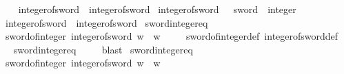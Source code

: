 \begin{isabellebody}
\ \ \isanewline
\ \ {\isachardoublequoteopen}integer{\isacharunderscore}{\kern0pt}of{\isacharunderscore}{\kern0pt}sword{}{}\ {\isasymequiv}\ integer{\isacharunderscore}{\kern0pt}of{\isacharunderscore}{\kern0pt}sword{\isachardoublequoteclose}\isanewline
\isanewline
{}\isamarkupfalse%
\ integer{\isacharunderscore}{\kern0pt}of{\isacharunderscore}{\kern0pt}sword{}{}\ {\isacharcolon}{\kern0pt}{\isacharcolon}{\kern0pt}\ {\isachardoublequoteopen}{}{}\ sword\ {\isasymRightarrow}\ integer{\isachardoublequoteclose}\isanewline
\ \ \isanewline
\ \ {\isachardoublequoteopen}integer{\isacharunderscore}{\kern0pt}of{\isacharunderscore}{\kern0pt}sword{}{}\ {\isasymequiv}\ integer{\isacharunderscore}{\kern0pt}of{\isacharunderscore}{\kern0pt}sword{\isachardoublequoteclose}\isanewline
\isanewline
{}\isamarkupfalse%
\ sword{}{\isacharunderscore}{\kern0pt}integer{\isacharunderscore}{\kern0pt}eq{\isacharcolon}{\kern0pt}\isanewline
\ \ {\isachardoublequoteopen}sword{}{\isacharunderscore}{\kern0pt}of{\isacharunderscore}{\kern0pt}integer\ {\isacharparenleft}{\kern0pt}integer{\isacharunderscore}{\kern0pt}of{\isacharunderscore}{\kern0pt}sword{}\ w{\isacharparenright}{\kern0pt}\ {\isacharequal}{\kern0pt}\ w{\isachardoublequoteclose}\ \isanewline
%
\isadelimproof
\ \ %
\endisadelimproof
%
\isatagproof
{}\isamarkupfalse%
\ sword{}{\isacharunderscore}{\kern0pt}of{\isacharunderscore}{\kern0pt}integer{\isacharunderscore}{\kern0pt}def\ integer{\isacharunderscore}{\kern0pt}of{\isacharunderscore}{\kern0pt}sword{}{\isacharunderscore}{\kern0pt}def\isanewline
\ \ \isamarkupfalse%
\ sword{\isacharunderscore}{\kern0pt}integer{\isacharunderscore}{\kern0pt}eq\ \isanewline
\ \ \isamarkupfalse%
\ blast%
\endisatagproof
{\isafoldproof}%
%
\isadelimproof
\isanewline
%
\endisadelimproof
\isanewline
{}\isamarkupfalse%
\ sword{}{}{\isacharunderscore}{\kern0pt}integer{\isacharunderscore}{\kern0pt}eq{\isacharcolon}{\kern0pt}\isanewline
\ \ {\isachardoublequoteopen}sword{}{}{\isacharunderscore}{\kern0pt}of{\isacharunderscore}{\kern0pt}integer\ {\isacharparenleft}{\kern0pt}integer{\isacharunderscore}{\kern0pt}of{\isacharunderscore}{\kern0pt}sword{}{}\ w{\isacharparenright}{\kern0pt}\ {\isacharequal}{\kern0pt}\ w{\isachardoublequoteclose}\ \isanewline

\end{isabellebody}
